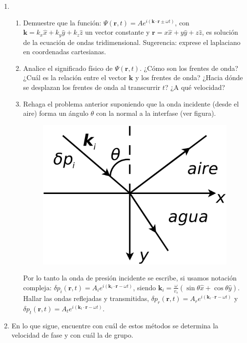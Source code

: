 \documentclass[11pt,spanish,a4paper]{article}
\begin{document}
\begin{enumerate}
\item \
\begin{enumerate}
\item Demuestre que la función: $\Psi(\mathbf{r},t)=Ae^{i(\mathbf{k}\cdot\mathbf{r}\pm\omega t)}$,
con $\mathbf{k}=k_{x}\hat{x}+k_{y}\hat{y}+k_{z}\hat{z}$ un vector
constante y $\mathbf{r}=x\hat{x}+y\hat{y}+z\hat{z}$, es solución
de la ecuación de ondas tridimensional. Sugerencia: exprese el laplaciano
en coordenadas cartesianas.
\item Analice el significado físico de $\Psi(\mathbf{r},t)$. ¿Cómo son
los frentes de onda? ¿Cuál es la relación entre el vector $\mathbf{k}$
y los frentes de onda? ¿Hacia dónde se desplazan los frentes de onda
al transcurrir $t$? ¿A qué velocidad?
\item Rehaga el problema anterior suponiendo que la onda incidente (desde
el aire) forma un ángulo $\theta$ con la normal a la interfase (ver
figura).
\begin{figure}[H]
\centering{}\includegraphics[clip,scale=0.25]{ej2-13}
\end{figure}
 Por lo tanto la onda de presión incidente se escribe, si usamos notación
 compleja: $\delta p_{i}(\mathbf{r},t)=A_{i}e^{i(\mathbf{k}_{i}\cdot\mathbf{r}-\omega t)}$,
 siendo $\mathbf{k}_{i}=\frac{\omega}{v_{s}}\left(\sin\theta\hat{x}+\cos\theta\hat{y}\right)$.
 Hallar las ondas reflejadas y transmitidas, $\delta p_{r}(\mathbf{r},t)=A_{r}e^{i(\mathbf{k}_{r}\cdot\mathbf{r}-\omega t)}$
 y $\delta p_{t}(\mathbf{r},t)=A_{t}e^{i(\mathbf{k}_{t}\cdot\mathbf{r}-\omega t)}$.
 \end{enumerate}
 \item En lo que sigue, encuentre con cuál de estos métodos se determina
 la velocidad de fase y con cuál la de grupo.



\end{enumerate}
\end{document}
